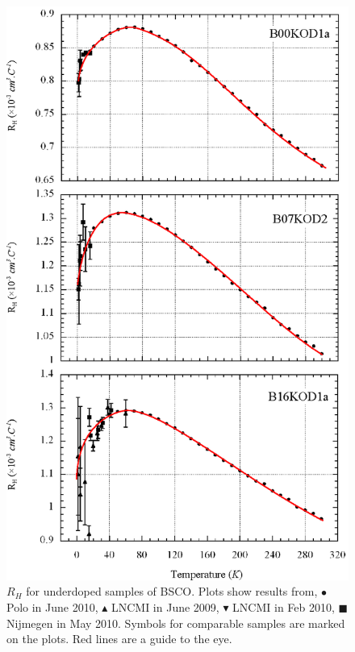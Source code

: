 \begin{figure}[htbp]
	\begin{center}
		\includegraphics[scale=0.9]{Chapter-HallBSCO/Figures/HallIndividual/HallIndividualOD}
		\caption{$R_H$ for underdoped samples of \ac{BSCO}. Plots show results from, $\bullet$ Polo in June 2010, $\blacktriangle$ \ac{LNCMI} in June 2009, $\blacktriangledown$ \ac{LNCMI} in Feb 2010, $\blacksquare$ Nijmegen in May 2010. Symbols for comparable samples are marked on the plots. Red lines are a guide to the eye.}
		\label{Fig:ResH:HallIndividualOD}
	\end{center}
\end{figure}

